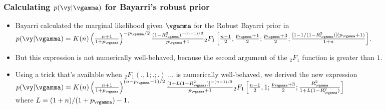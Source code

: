 \begin{frame}
	\frametitle{Calculating $p(\vy | \vgamma)$ for Bayarri's robust prior}
	\begin{itemize}
		\item Bayarri calculated the marginal likelihood given $\vgamma$ for the Robust Bayarri prior
		 	in \cite{Bayarri2012} 
			\tiny
			$p(\vy | \vgamma) = K(n) \left(\frac{n + 1}{1 + p_\vgamma}\right)^{-p_\vgamma/2} \frac{(1 - R^2_\vgamma)^{-(n-1)/2}}{p_\vgamma + 1} {}_2 F_1 \left[ \frac{n-1}{2}, \frac{p_\vgamma+1}{2}; \frac{p_\vgamma + 3}{2}; \frac{[1 - 1/(1 - R^2_\vgamma)](p_\vgamma + 1)}{1 + n} \right]$.
		\small
		\item But this expression is not numerically well-behaved, because the second argument of the
					${}_2 F_1$ function is greater than $1$.
		\item Using a trick that's available when ${}_2 F_1(., 1; .; .)$ ... is numerically
					well-behaved, we derived the new expression
			\tiny
			$p(\vy | \vgamma) = K(n) \left(\frac{n + 1}{1 + p_\vgamma}\right)^{(n-p_\vgamma-1)/2} \frac{[1 + L (1 - R^2_\vgamma)]^{-(n-1)/2}}{p_\vgamma + 1} {}_2 F_1 \left[ \frac{n-1}{2}, 1; \frac{p_\vgamma + 3}{2}; 
			\frac{R^2_\vgamma}{1 + L(1 - R^2_\vgamma)} \right]$ \\
			\small
			where $L = (1 + n)/(1 + p_\vgamma) - 1$.
	\end{itemize}
\end{frame}

